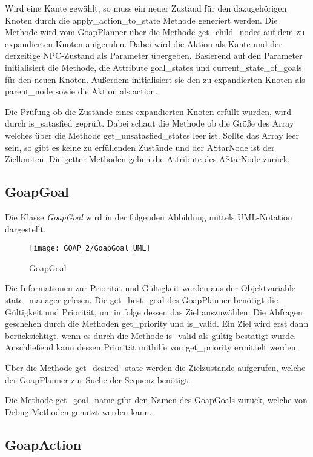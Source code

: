 Wird eine Kante gewählt, so muss ein neuer Zustand für den dazugehörigen Knoten durch die apply\_action\_to\_state Methode generiert werden. Die Methode wird vom GoapPlanner über die Methode get\_child\_nodes auf dem zu expandierten Knoten aufgerufen. Dabei wird die Aktion als Kante und der derzeitige NPC-Zustand als Parameter übergeben. Basierend auf den Parameter initialisiert die Methode, die Attribute goal\_states und current\_state\_of\_goals für den neuen Knoten. Außerdem initialisiert sie den zu expandierten Knoten als parent\_node sowie die Aktion als action.

Die Prüfung ob die Zustände eines expandierten Knoten erfüllt wurden, wird durch is\_satasfied geprüft. Dabei schaut die Methode ob die Größe des Array welches über die Methode get\_unsatasfied\_states leer ist. Sollte das Array leer sein, so gibt es keine zu erfüllenden Zustände und der AStarNode ist der Zielknoten. Die getter-Methoden geben die Attribute des AStarNode zurück.

\subsection{GoapGoal}

Die Klasse \textit{GoapGoal} wird in der folgenden Abbildung mittels UML-Notation dargestellt. 

\begin{figure}[h]
  \centering
  \texttt{[image: GOAP\_2/GoapGoal\_UML]}
	\captionsetup{justification=justified, format=plain}
  \caption{GoapGoal}
  \label{GoapGoal}
\end{figure}

Die Informationen zur Priorität und Gültigkeit werden aus der Objektvariable state\_manager gelesen. Die get\_best\_goal des GoapPlanner benötigt die Gültigkeit und Priorität, um in folge dessen das Ziel auszuwählen. Die Abfragen geschehen durch die Methoden get\_priority und is\_valid. Ein Ziel wird erst dann berücksichtigt, wenn es durch die Methode is\_valid als gültig bestätigt wurde. Anschließend kann dessen Priorität mithilfe von get\_priority ermittelt werden. 

Über die Methode get\_desired\_state werden die Zielzustände aufgerufen, welche der GoapPlanner zur Suche der Sequenz benötigt. 

Die Methode get\_goal\_name gibt den Namen des GoapGoals zurück, welche von Debug Methoden genutzt werden kann.



\subsection{GoapAction}

